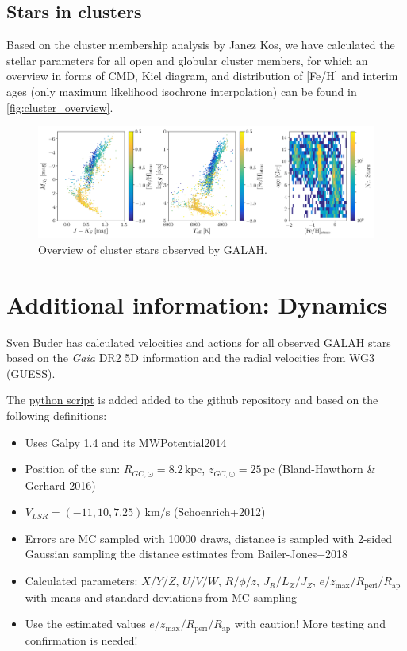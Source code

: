 \documentclass[a4paper,11pt,english]{article}
\begin{document}
\subsection{Stars in clusters}

Based on the cluster membership analysis by Janez Kos, we have calculated the stellar parameters for all open and globular cluster members, for which an overview in forms of CMD, Kiel diagram, and distribution of [Fe/H] and interim ages (only maximum likelihood isochrone interpolation) can be found in \autoref{fig:cluster_overview}.

\begin{figure}[!ht]
\centering
\includegraphics[width=\textwidth]{../../clusters/figures/CMD_Kiel_FehAge.png}
\caption{Overview of cluster stars observed by GALAH.}
\label{fig:cluster_overview}
\end{figure}

\section{Additional information: Dynamics}

Sven Buder has calculated velocities and actions for all observed GALAH stars based on the \textit{Gaia} DR2 5D information and the radial velocities from WG3 (GUESS).

The \href{https://github.com/svenbuder/GALAH_DR3/blob/master/dynamics/calculate_orbits.ipynb}{python script} is added added to the github repository and based on the following definitions:
\begin{itemize}
\item Uses Galpy 1.4  and its MWPotential2014
\item Position of the sun: $R_{GC,\odot} = 8.2\,\mathrm{kpc}$, $z_{GC,\odot} = 25\,\mathrm{pc}$ (Bland-Hawthorn \& Gerhard 2016)
\item $V_{LSR} = (-11, 10, 7.25)\,\mathrm{km/s}$ (Schoenrich+2012)
\item Errors are MC sampled with 10000 draws, distance is sampled with 2-sided Gaussian sampling the distance estimates from Bailer-Jones+2018
\item Calculated parameters: $X / Y / Z$, $U / V / W$, $R / \phi / z$, $J_R / L_Z / J_Z$, $e / z_\text{max} / R_\text{peri} / R_\text{ap}$ with means and standard deviations from MC sampling
\item Use the estimated values $e / z_\text{max} / R_\text{peri} / R_\text{ap}$ with caution! More testing and confirmation is needed!
\end{itemize}
\end{document}
